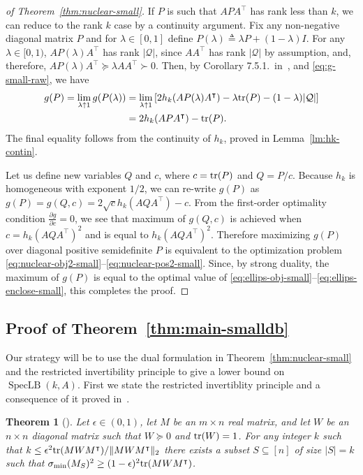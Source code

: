 \documentclass{article}
\newtheorem{theorem}{Theorem}[section]
\def\tr{{\rm tr}} \def\rank{{\rm rank}}
\DeclareMathOperator{\specLB}{SpecLB}
\newcommand{\tra}{\intercal}
\newcommand{\quer}{\mathcal{Q}}
\begin{document}
\begin{proof}[of Theorem~\ref{thm:nuclear-small}]
  If $P$ is such that $APA^\tra$ has rank less than $k$, we can reduce
  to the rank $k$ case by a continuity argument. Fix any non-negative
  diagonal matrix $P$ and for $\lambda \in [0,1]$ define $P(\lambda)
  \triangleq \lambda P + (1-\lambda)I$. For any $\lambda \in [0, 1)$,
  $AP(\lambda)A^\tra$ has rank $|\quer|$, since $AA^\tra$ has rank
  $|\quer|$ by assumption, and, therefore, $AP(\lambda)A^\tra \succeq
  \lambda AA^\tra \succ 0$. Then, by Corollary
  7.5.1.~in~\cite{Rockafellar}, and \eqref{eq:g-small-raw}, we have
  \begin{align*}
  g(P) = \lim_{\lambda \uparrow 1}{g(P(\lambda))} &=
  \lim_{\lambda \uparrow 1}{[2h_k(AP(\lambda)A^\tra) - \lambda\tr(P)
  - (1-\lambda) |\quer|]} \\
  &=  2h_k(APA^\tra) - \tr(P).
  \end{align*} 
  The final equality follows from the continuity of $h_k$, proved in
  Lemma~\ref{lm:hk-contin}. 
  
  Let us define new variables $Q$ and $c$, where $c = \tr(P)$ and $Q =
  P/c$. Because $h_k$ is homogeneous with exponent $1/2$, we can
  re-write $g(P)$ as $ g(P) = g(Q,c) = 2\sqrt{c}h_k(AQA^\tra) - c$.
  From the first-order optimality condition $\frac{\partial
    g}{\partial c} = 0$, we see that maximum of $g(Q,c)$ is achieved
  when $c = h_k(AQA^\tra)^2$ and is equal to
  $h_k(AQA^\tra)^2$. Therefore maximizing $g(P)$ over diagonal
  positive semidefinite $P$ is equivalent to the optimization problem
  \eqref{eq:nuclear-obj2-small}--\eqref{eq:nuclear-pos2-small}. Since,
  by strong duality, the maximum of $g(P)$ is equal to the optimal
  value of
  \eqref{eq:ellips-obj-small}--\eqref{eq:ellips-enclose-small}, this
  completes the proof. 
\end{proof}

\subsection{Proof of  Theorem~\ref{thm:main-smalldb}}

Our strategy will be to use the dual formulation in
Theorem~\ref{thm:nuclear-small} and the restricted invertibility
principle to give a lower bound on $\specLB(k, A)$. First we state the
restricted invertiblity principle and a consequence of it proved in~\cite{apx-disc}.

\begin{theorem}[\cite{bour-tza,bt-constructive}]\label{thm:bt}
  Let $\epsilon \in (0,1)$, let $M$ be an $m\times n$ real matrix, and
  let $W$ be an $n\times n$ diagonal matrix such that $W \succeq 0$
  and $\tr(W) = 1$. For any integer $k$ such that $k \leq \epsilon^2
  {\tr(MWM^\tra)}/{\|MWM^\tra\|_2}$ there exists a subset
  $S \subseteq [n]$ of size $|S| = k$ such that
  $\sigma_{\min}(M_S)^2 \geq (1-\epsilon)^2\tr(MWM^\tra)$. 
\end{theorem}
\end{document}
